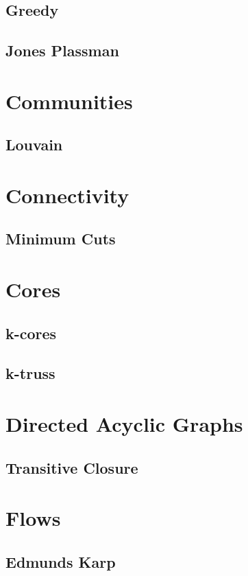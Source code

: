 \subsection{Greedy}

\subsection{Jones Plassman}

\section{Communities}
\subsection{Louvain}

\section{Connectivity}
\subsection{Minimum Cuts}

\section{Cores}
\subsection{k-cores}
\subsection{k-truss}

\section{Directed Acyclic Graphs}
\subsection{Transitive Closure}

\section{Flows}
\subsection{Edmunds Karp}
